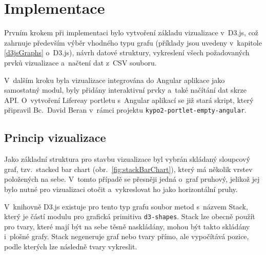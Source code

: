 \documentclass[
  digital, %
  oneside, %
  table,   %
  nolof,     %
  nolot,     %
]{fithesis3}
\begin{document}
\chapter{Implementace}
Prvním krokem při implementaci bylo vytvoření základu vizualizace v~D3.js, což zahrnuje především výběr vhodného typu grafu (příklady jsou uvedeny v~kapitole \ref{d3jsGraphs} o~D3.js), návrh datové struktury, vykreslení všech požadovaných prvků vizualizace a~načtení dat z~CSV souboru.\par
V~dalším kroku byla vizualizace integrována do Angular aplikace jako samostatný modul, byly přidány interaktivní prvky a~také načítání dat skrze API. O~vytvoření Lifereay portletu s~Angular aplikací se již stará skript, který připravil Bc.~David Beran v~rámci projektu \verb|kypo2-portlet-empty-angular|.
\section{Princip vizualizace}
Jako základní struktura pro stavbu vizualizace byl vybrán skládaný sloupcový graf, tzv.~stacked bar chart (obr.~\ref{fig:stackBarChart}), který má několik vrstev položených na sebe. V~tomto případě se přesněji jedná o~graf pruhový, jelikož jej bylo nutné pro vizualizaci otočit a~vykreslovat ho jako horizontální pruhy.\par
V~knihovně D3.js existuje pro tento typ grafu soubor metod s~názvem Stack, který je částí modulu pro grafická primitiva \verb|d3-shapes|. Stack lze obecně použít pro tvary, které mají být na sebe těsně naskládány, mohou být takto skládány i~plošné grafy. Stack negeneruje graf nebo tvary přímo, ale vypočítává pozice, podle kterých lze následně tvary vykreslit. \cite{d3jsorg}\par
\end{document}
